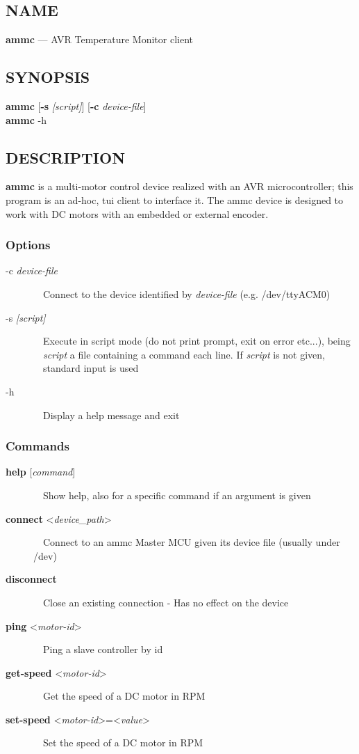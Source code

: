 \subsection*{NAME}
\textbf{ammc} — AVR Temperature Monitor client

\subsection*{SYNOPSIS}
\textbf{ammc} [\textbf{-s} \emph{[script]}] [\textbf{-c} \emph{device-file}] \\
\textbf{ammc} -h

\subsection*{DESCRIPTION}
\textbf{ammc} is a multi-motor control device realized with an AVR microcontroller;
this program is an ad-hoc, tui client to interface it.  
The ammc device is designed to work with DC motors with an embedded or external
encoder.

\subsubsection*{Options}
\begin{description}
\item[-c \emph{device-file}]
\ \ Connect to the device identified by \emph{device-file} (e.g. /dev/ttyACM0)

\item[-s \emph{[script]}]
\ \ Execute in script mode (do not print prompt, exit on error etc...), being
\ \ \emph{script} a file containing a command each line. If \emph{script} is not given,
\ \ standard input is used

\item[-h]
\ \ Display a help message and exit
\end{description}

\subsubsection*{Commands}
\begin{description}
  \item[\textbf{help} [\emph{command}\textrm{]}]
  \ \ Show help, also for a specific command if an argument is given

  \item[\textbf{connect} <\emph{device\_path}>]
  \ \ Connect to an ammc Master MCU given its device file (usually under /dev)

  \item[\textbf{disconnect}]
  \ \ Close an existing connection - Has no effect on the device

  \item[\textbf{ping} <\emph{motor-id}>]
  \ \ Ping a slave controller by id

  \item[\textbf{get-speed} <\emph{motor-id}>]
  \ \ Get the speed of a DC motor in RPM

  \item[\textbf{set-speed} <\emph{motor-id}>=<\emph{value}>]
  \ \ Set the speed of a DC motor in RPM
\end{description}


